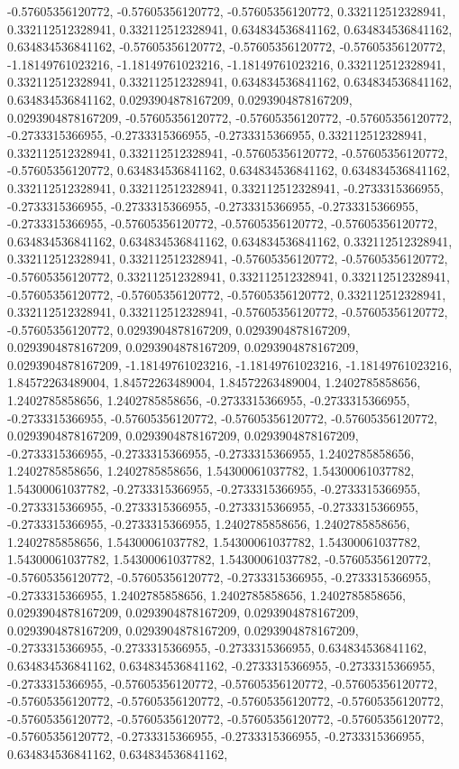 \documentclass[
  ,man]{apa6}
\begin{document}
-0.57605356120772, -0.57605356120772, -0.57605356120772, 0.332112512328941, 0.332112512328941, 0.332112512328941, 0.634834536841162, 0.634834536841162, 0.634834536841162, -0.57605356120772, -0.57605356120772, -0.57605356120772, -1.18149761023216, -1.18149761023216, -1.18149761023216, 0.332112512328941, 0.332112512328941, 0.332112512328941, 0.634834536841162, 0.634834536841162, 0.634834536841162, 0.0293904878167209, 0.0293904878167209, 0.0293904878167209, -0.57605356120772, -0.57605356120772, -0.57605356120772,
-0.2733315366955, -0.2733315366955, -0.2733315366955, 0.332112512328941, 0.332112512328941, 0.332112512328941, -0.57605356120772, -0.57605356120772, -0.57605356120772, 0.634834536841162, 0.634834536841162, 0.634834536841162, 0.332112512328941, 0.332112512328941, 0.332112512328941, -0.2733315366955, -0.2733315366955, -0.2733315366955, -0.2733315366955, -0.2733315366955, -0.2733315366955, -0.57605356120772, -0.57605356120772, -0.57605356120772, 0.634834536841162, 0.634834536841162, 0.634834536841162,
0.332112512328941, 0.332112512328941, 0.332112512328941, -0.57605356120772, -0.57605356120772, -0.57605356120772, 0.332112512328941, 0.332112512328941, 0.332112512328941, -0.57605356120772, -0.57605356120772, -0.57605356120772, 0.332112512328941, 0.332112512328941, 0.332112512328941, -0.57605356120772, -0.57605356120772, -0.57605356120772, 0.0293904878167209, 0.0293904878167209, 0.0293904878167209, 0.0293904878167209, 0.0293904878167209, 0.0293904878167209, -1.18149761023216, -1.18149761023216, -1.18149761023216,
1.84572263489004, 1.84572263489004, 1.84572263489004, 1.2402785858656, 1.2402785858656, 1.2402785858656, -0.2733315366955, -0.2733315366955, -0.2733315366955, -0.57605356120772, -0.57605356120772, -0.57605356120772, 0.0293904878167209, 0.0293904878167209, 0.0293904878167209, -0.2733315366955, -0.2733315366955, -0.2733315366955, 1.2402785858656, 1.2402785858656, 1.2402785858656, 1.54300061037782, 1.54300061037782, 1.54300061037782, -0.2733315366955, -0.2733315366955, -0.2733315366955, -0.2733315366955,
-0.2733315366955, -0.2733315366955, -0.2733315366955, -0.2733315366955, -0.2733315366955, 1.2402785858656, 1.2402785858656, 1.2402785858656, 1.54300061037782, 1.54300061037782, 1.54300061037782, 1.54300061037782, 1.54300061037782, 1.54300061037782, -0.57605356120772, -0.57605356120772, -0.57605356120772, -0.2733315366955, -0.2733315366955, -0.2733315366955, 1.2402785858656, 1.2402785858656, 1.2402785858656, 0.0293904878167209, 0.0293904878167209, 0.0293904878167209, 0.0293904878167209, 0.0293904878167209,
0.0293904878167209, -0.2733315366955, -0.2733315366955, -0.2733315366955, 0.634834536841162, 0.634834536841162, 0.634834536841162, -0.2733315366955, -0.2733315366955, -0.2733315366955, -0.57605356120772, -0.57605356120772, -0.57605356120772, -0.57605356120772, -0.57605356120772, -0.57605356120772, -0.57605356120772, -0.57605356120772, -0.57605356120772, -0.57605356120772, -0.57605356120772, -0.57605356120772, -0.2733315366955, -0.2733315366955, -0.2733315366955, 0.634834536841162, 0.634834536841162,
\end{document}
